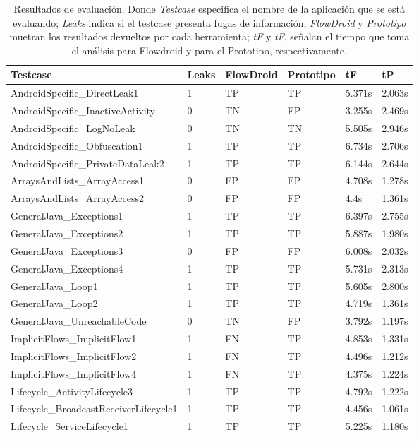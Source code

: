 \begin{table}[H]
\small\addtolength{\tabcolsep}{-3pt}
\caption{Resultados de evaluación. Donde
\textit{Testcase} especifica el nombre de la aplicación que se está evaluando;
\textit{Leaks} indica si el testcase presenta fugas de información;
\textit{FlowDroid} y  \textit{Prototipo} muetran los resultados devueltos por
cada herramienta; \textit{tF} y \textit{tF}, señalan el tiempo que toma el
análisis para Flowdroid y para el Prototipo, respectivamente.}
\label{tb:resultados}
\begin{tabular}{|p{5.8cm}|p{1cm}|p{2.1cm}|p{2.1cm}|p{1cm}|p{1cm}|}
	\hline
	\textbf{Testcase} & \textbf{Leaks} & \textbf{FlowDroid} &
	\textbf{Prototipo} & \textbf{ tF} & 
	\textbf{tP}\\
	\hline
	AndroidSpecific\_DirectLeak1 & 1 & TP & TP &5.371s &2.063s\\
	\hline
	AndroidSpecific\_InactiveActivity & 0 & TN & FP  &3.255s &2.469s\\
	\hline
	AndroidSpecific\_LogNoLeak & 0 & TN & TN &5.505s &2.946s\\
	\hline
	AndroidSpecific\_Obfuscation1 & 1 & TP & TP &6.734s &2.706s\\
	\hline
	 AndroidSpecific\_PrivateDataLeak2 & 1 & TP & TP & 6.144s &2.644s\\
	\hline
	 ArraysAndLists\_ArrayAccess1 & 0 & FP & FP & 4.708s & 1.278s\\
	\hline
	 ArraysAndLists\_ArrayAccess2 & 0 & FP & FP & 4.4s &1.361s\\
	 \hline
	 GeneralJava\_Exceptions1 & 1 & TP & TP &6.397s &2.755s\\
	\hline
	 GeneralJava\_Exceptions2 & 1 & TP & TP &5.887s &1.980s\\
	\hline
	GeneralJava\_Exceptions3 & 0 & FP & FP &6.008s &2.032s\\
	\hline
	GeneralJava\_Exceptions4 & 1 & TP & TP &5.731s &2.313s\\
	\hline
	GeneralJava\_Loop1 & 1 & TP & TP &5.605s &2.800s\\
	\hline
	GeneralJava\_Loop2 & 1 & TP & TP &4.719s &1.361s\\
	\hline
	GeneralJava\_UnreachableCode & 0 & TN & FP &3.792s &1.197s\\
	\hline
	ImplicitFlows\_ImplicitFlow1 & 1 & FN & TP &4.853s &1.331s\\
	\hline
	ImplicitFlows\_ImplicitFlow2 & 1 & FN & TP &4.496s &1.212s\\
	\hline
	ImplicitFlows\_ImplicitFlow4 & 1 & FN & TP &4.375s &1.224s\\
	\hline
	Lifecycle\_ActivityLifecycle3 & 1 & TP & TP &4.792s &1.222s\\
	\hline
	Lifecycle\_BroadcastReceiverLifecycle1 & 1 & TP & TP &4.456s &1.061s\\
	\hline
	Lifecycle\_ServiceLifecycle1 & 1 & TP & TP &5.225s &1.180s\\
	\hline
\end{tabular}
\end{table}

